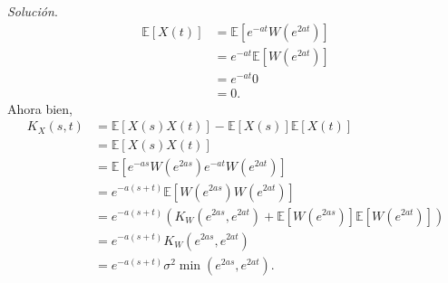 \documentclass[12pt]{article}
\newcommand{\E}{\mathbb{E}}
\begin{document}
\textit{Solución}.
\begin{align*}
    \E[X(t)] &= \E[e^{-at}W(e^{2at})] \\
    &= e^{-at} \E[W(e^{2at})] \\
    &= e^{-at} 0 \\
    &= 0.
\end{align*}
Ahora bien,
\begin{align*}
    K_X(s,t) &= \E[X(s)X(t)] - \E[X(s)]\E[X(t)] \\
    &= \E[X(s)X(t)] \\
    &= \E[e^{-as}W(e^{2as})e^{-at}W(e^{2at})] \\
    &= e^{-a(s+t)} \E[W(e^{2as})W(e^{2at})] \\
    &= e^{-a(s+t)} (K_W(e^{2as}, e^{2at}) + \E[W(e^{2as})]\E[W(e^{2at})]) \\
    &= e^{-a(s+t)} K_W(e^{2as}, e^{2at}) \\
    &= e^{-a(s+t)} \sigma^2 \min(e^{2as}, e^{2at}).
\end{align*}
\end{document}

